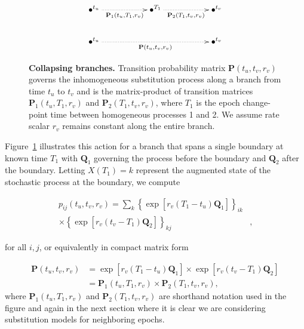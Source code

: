 \begin{figure}[h!]
\centering
\begingroup
\everymath{\displaystyle}
{\Large
\begin{displaymath} %
    \xymatrix{ 
    \bullet^{t_u} \ar@{.>}[rr]_{\mathbf{P}_{1}(t_{u},T_{1},r_v)} && \bullet^{T_1} \ar@{.>}[rr]_{\mathbf{P}_{2}(T_{1},t_{v},r_v)} && \bullet^{t_v} \\
    \bullet^{t_u} \ar@{.>}[rrrr]_{\mathbf{P}(t_{u},t_{v},r_v)} & & & & \bullet^{t_v}
    } %
\end{displaymath}
}
\endgroup
\caption{
{ \footnotesize 
{\bf Collapsing branches.} Transition probability matrix $\mathbf{P}(t_u,t_v,r_v)$ governs the inhomogeneous substitution process along a branch from time $t_u$ to $t_v$ and is the matrix-product of transition matrices $\mathbf{P}_{1}(t_u,T_1,r_v)$ and $\mathbf{P}_{2}(T_1,t_v,r_v)$, where $T_1$ is the epoch change-point time between homogeneous processes 1 and 2.  We assume rate scalar $r_v$ remains constant along the entire branch.
} %
}
\label{fig:collapsing}
\end{figure}

Figure~\ref{fig:collapsing} illustrates this action for a branch that spans a single boundary at known time $T_1$ with $\mathbf{Q}_1$ governing the process before the boundary and $\mathbf{Q}_2$ after the boundary. Letting $X(T_1) = k$ represent the augmented state of the stochastic process at the boundary, we compute

\begin{align}
p_{ij}(t_u, t_v, r_v)
= \sum_{k} 
\left\{
\exp[ r_v ( T_1 - t_u ) \mathbf{Q}_1]
\right\}_{ik} & \nonumber \\
\times 
\left\{
\exp[ r_v ( t_v - T_1 ) \mathbf{Q}_2]
\right\}_{kj} & , 
\end{align}

\noindent
for all $i,j$, or equivalently in compact matrix form

\begin{align}
\mathbf{P}(t_u, t_v, r_v)
&= 
\exp[ r_v ( T_1 - t_u ) \mathbf{Q}_1]
\times
\exp[ r_v ( t_v - T_1 ) \mathbf{Q}_2] \nonumber \\
&= \mathbf{P}_{1}(t_u, T_1, r_v) \times \mathbf{P}_{2}(T_1, t_v, r_v) ,
\label{matrixProduct}
\end{align}
where 
$\mathbf{P}_{1}(t_u, T_1, r_v)$ and $\mathbf{P}_{2}(T_1, t_v, r_v)$ are shorthand notation used in the figure and again in the next section where it is clear we are considering substitution models for neighboring epochs.


